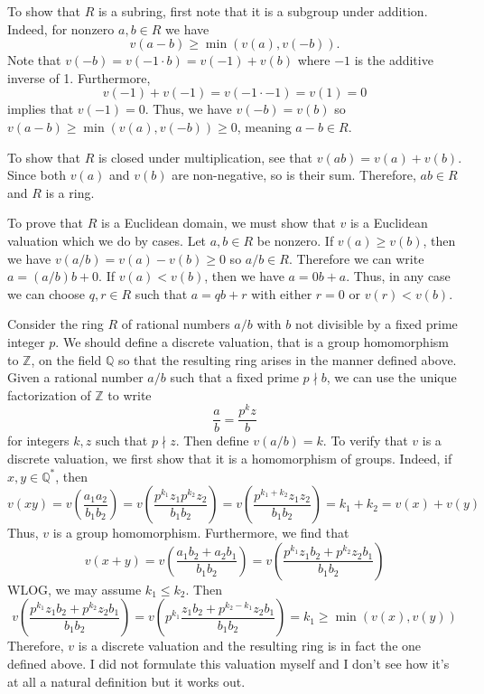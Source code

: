 \documentclass[../../master.tex]{subfiles}
\begin{document}
    \begin{solution}
        To show that $R$ is a subring, first note that it is a subgroup under
        addition. Indeed, for nonzero $a, b \in R$ we have
        \[
            v(a - b) \geq \min(v(a), v(-b)).
        \] 
        Note that $v(-b) = v(-1 \cdot b) = v(-1) + v(b)$ where $-1$ is the
        additive inverse of 1. Furthermore, 
        \[
            v(-1) + v(-1) = v(-1 \cdot -1) = v(1) = 0
        \]
        implies that $v(-1) = 0$. Thus, we have $v(-b) = v(b)$ so $v(a
        - b) \geq \min(v(a), v(-b)) \geq 0$, meaning $a - b \in R$.

        To show that $R$ is closed under multiplication, see that $v(ab) = v(a)
        + v(b)$. Since both $v(a)$ and $v(b)$ are non-negative, so is their sum.
        Therefore, $ab \in R$ and $R$ is a ring.

        To prove that $R$ is a Euclidean domain, we must show that $v$ is a
        Euclidean valuation which we do by cases. Let $a, b \in R$ be nonzero.
        If $v(a) \geq v(b)$, then we have $v(a / b) = v(a) - v(b) \geq 0$ so $a
        / b \in R$. Therefore we can write $a = (a / b)  b + 0$. If $v(a) < v(b)$,
        then we have $a = 0b + a$. Thus, in any case we can choose $q, r \in R$
        such that $a = qb + r$ with either $r = 0$ or $v(r) < v(b)$.

        Consider the ring $R$ of rational numbers $a / b$ with $b$ not divisible
        by a fixed prime integer $p$. We should define a discrete valuation,
        that is a group homomorphism to $\mathbb{Z}$, on the field $\mathbb{Q}$ so that
        the resulting ring arises in the manner defined above. Given a rational
        number $a / b$ such that a fixed prime $p \nmid b$, we can use the
        unique factorization of $\mathbb{Z}$ to write 
        \[
        \frac{a}{b} = \frac{p^{k}z}{b}
        \] 
        for integers $k, z$ such that $p \nmid z$. Then define $v(a / b) = k$.
        To verify that $v$ is a discrete valuation, we first show that it is a
        homomorphism of groups.
        Indeed, if $x, y \in \mathbb{Q}^{*}$, then 
        \[
            v(xy) = v\left(\frac{a_1a_2}{b_1 b_2}\right) = 
            v \left(\frac{p^{k_1}z_1 p^{k_2}z_2}{b_1 b_2}\right) =
            v \left(\frac{p^{k_1 + k_2}z_1 z_2}{b_1 b_2}\right) = k_1 + k_2 =
            v(x) + v(y)
        \] 
        Thus, $v$ is a group homomorphism. Furthermore, we find that
        \[
            v(x + y) = v\left(\frac{a_1 b_2 + a_2 b_1}{b_1 b_2}\right) =
            v\left( \frac{p^{k_1}z_1 b_2 + p^{k_2}z_2 b_1}{b_1 b_2} \right)
        \] 
        WLOG, we may assume $k_1 \leq k_2$. Then
        \[
            v\left(\frac{p^{k_1}z_1 b_2 + p^{k_2}z_2 b_1}{b_1 b_2}\right) = 
            v\left(p^{k_1} \frac{z_1 b_2 + p^{k_2 - k_1}z_2 b_1}{b_1 b_2}\right)
            = k_1 \geq \min(v(x), v(y))
        \] 
        Therefore, $v$ is a discrete valuation and the resulting ring is in fact
        the one defined above. I did not formulate this valuation myself and I
        don't see how it's at all a natural definition but it works out.
    \end{solution}
\end{document}

